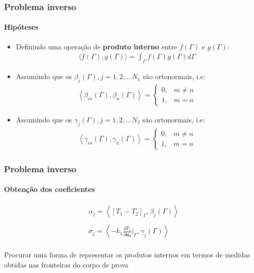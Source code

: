 \documentclass{beamer}
\begin{document}
\begin{frame}
	\frametitle{Problema inverso}
	\framesubtitle{Hipóteses}
	\begin{itemize}
		\item Definindo uma operação de \textbf{produto interno} entre $f(\Gamma)$ e $g(\Gamma)$:
		\begin{align*}
		 \langle f(\Gamma), g(\Gamma) \rangle = \int_{\Gamma} f(\Gamma) g(\Gamma)d\Gamma
		\end{align*}
		\item Assumindo que os $\beta_j(\Gamma), j=1,2,\ldots N_1$ são ortonormais, i.e:
		\begin{align*}
		\left\langle  \beta_m(\Gamma), \beta_n(\Gamma) \right\rangle = \left\lbrace
		\begin{matrix}
		0, & m \neq n \\
		1, & m = n 
		\end{matrix}
		\right.
		\end{align*}
		
		\item Assumindo que os $\gamma_j(\Gamma), j=1,2,\ldots N_2$ são ortonormais, i.e:
		\begin{align*}
		\left\langle  \gamma_m(\Gamma), \gamma_n(\Gamma) \right\rangle = \left\lbrace
		\begin{matrix}
		0, & m \neq n \\
		1, & m = n 
		\end{matrix}
		\right.
		\end{align*}
	\end{itemize}
\end{frame}

\begin{frame}
	\frametitle{Problema inverso}
	\framesubtitle{Obtenção dos coeficientes}
	\begin{alertblock}{}
	\begin{align*}
		& \alpha_j = \left\langle [T_1 - T_2]_\Gamma, \beta_j(\Gamma) \right\rangle \\ \\
		& \sigma_j = \left\langle - k_1 \frac{\partial T_1}{\partial\mathbf{n_1}}\bigg|_\Gamma, \gamma_j(\Gamma) \right\rangle \\
	\end{align*}
\end{alertblock}
	
	Procurar uma forma de representar os produtos internos em termos de medidas obtidas nas fronteiras do corpo de prova
\end{frame}
\end{document}
